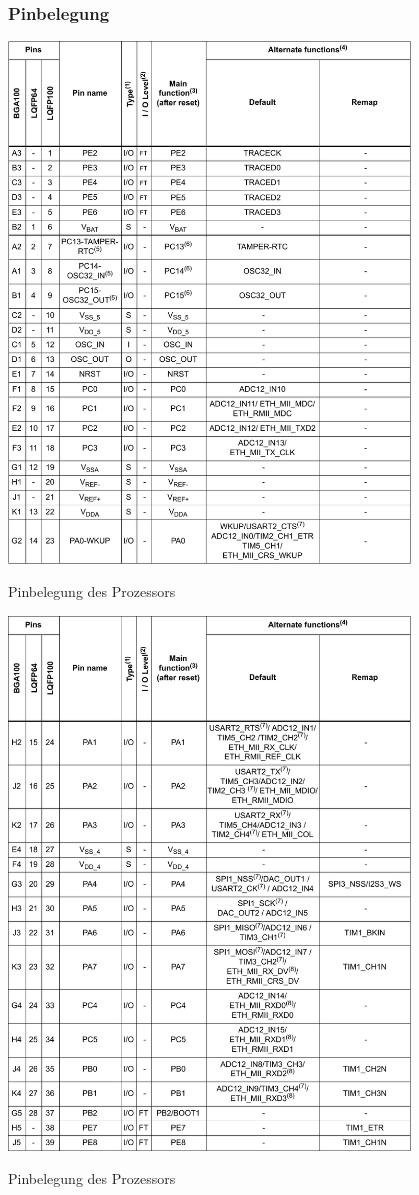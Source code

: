 \subsubsection{Pinbelegung}
\begin{table}[htb]
    \centering
    \includegraphics[width=0.8\textwidth]{Schuh/Pictures/Pinbelegung1}
    \caption[Pinbelegung des Prozessors]{Pinbelegung des Prozessors}
    \label{tab:coremodul-cpupins}
\end{table}
\begin{table}[htb]\ContinuedFloat
    \centering
    \includegraphics[width=0.8\textwidth]{Schuh/Pictures/Pinbelegung2}
    \caption[Pinbelegung des Prozessors]{Pinbelegung des Prozessors}
\end{table}
